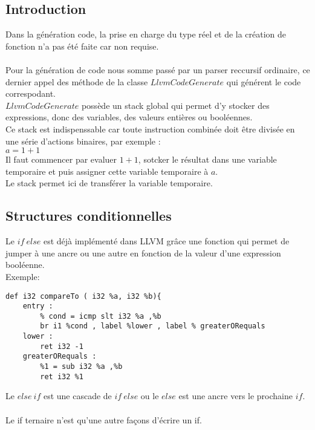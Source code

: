 \documentclass[a4paper,10pt]{article}
\begin{document}
\subsection{Introduction}
Dans la génération code, la prise en charge du type réel et de la création de fonction n'a pas été faite car non requise.\\
 \\
Pour la génération de code nous somme passé par un parser reccursif ordinaire, ce dernier appel des méthode de la classe $LlvmCodeGenerate$ qui générent le code correspodant.\\
$LlvmCodeGenerate$ possède un stack global qui permet d'y stocker des expressions, donc des variables, des valeurs entières ou booléennes.\\
Ce stack est indispenssable car toute instruction combinée doit être divisée en une série d'actions binaires, par exemple :\\
$a = 1 + 1$\\
Il faut commencer par evaluer $1 + 1$, sotcker le résultat dans une variable temporaire et puis assigner cette variable temporaire à $a$.\\
Le stack permet ici de transférer la variable temporaire.
\subsection{Structures conditionnelles}
Le $if\ else$ est déjà implémenté dans LLVM grâce une fonction qui permet de jumper à une ancre ou une autre en fonction de la valeur d'une expression booléenne.\\
Exemple:
\begin{verbatim}
def i32 compareTo ( i32 %a, i32 %b){
    entry :
        % cond = icmp slt i32 %a ,%b
        br i1 %cond , label %lower , label % greaterORequals
    lower :
        ret i32 -1
    greaterORequals :
        %1 = sub i32 %a ,%b
        ret i32 %1
\end{verbatim}
Le $else\ if$ est une cascade de $if\ else$ ou le $else$ est une ancre vers le prochaine $if$.\\\\
Le if ternaire n'est qu'une autre façons d'écrire un if.
\end{document}
